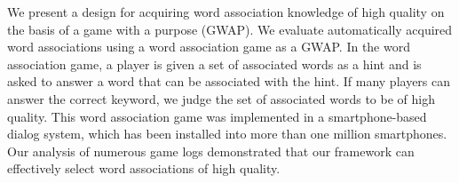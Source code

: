 We present a design for acquiring word association knowledge of high quality on the basis of a game with a purpose (GWAP). We evaluate automatically acquired word associations using a word association game as a GWAP. In the word association game, a player is given a set of associated words as a hint and is asked to answer a word that can be associated with the hint. If many players can answer the correct keyword, we judge the set of associated words to be of high quality. This word association game was implemented in a smartphone-based dialog system, which has been installed into more than one million smartphones. Our analysis of numerous game logs demonstrated that our framework can effectively select word associations of high quality.
